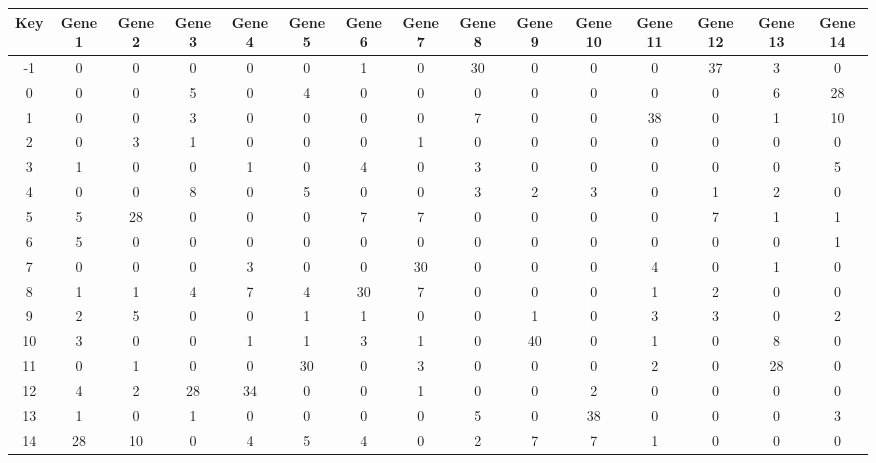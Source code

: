 \begin{tabular}{|c|c|c|c|c|c|c|c|c|c|c|c|c|c|c|}
\hline
Key & Gene 1 & Gene 2 & Gene 3 & Gene 4 & Gene 5 & Gene 6 & Gene 7 & Gene 8 & Gene 9 & Gene 10 & Gene 11 & Gene 12 & Gene 13 & Gene 14 \\
\hline
-1 & 0 & 0 & 0 & 0 & 0 & 1 & 0 & 30 & 0 & 0 & 0 & 37 & 3 & 0 \\
0 & 0 & 0 & 5 & 0 & 4 & 0 & 0 & 0 & 0 & 0 & 0 & 0 & 6 & 28 \\
1 & 0 & 0 & 3 & 0 & 0 & 0 & 0 & 7 & 0 & 0 & 38 & 0 & 1 & 10 \\
2 & 0 & 3 & 1 & 0 & 0 & 0 & 1 & 0 & 0 & 0 & 0 & 0 & 0 & 0 \\
3 & 1 & 0 & 0 & 1 & 0 & 4 & 0 & 3 & 0 & 0 & 0 & 0 & 0 & 5 \\
4 & 0 & 0 & 8 & 0 & 5 & 0 & 0 & 3 & 2 & 3 & 0 & 1 & 2 & 0 \\
5 & 5 & 28 & 0 & 0 & 0 & 7 & 7 & 0 & 0 & 0 & 0 & 7 & 1 & 1 \\
6 & 5 & 0 & 0 & 0 & 0 & 0 & 0 & 0 & 0 & 0 & 0 & 0 & 0 & 1 \\
7 & 0 & 0 & 0 & 3 & 0 & 0 & 30 & 0 & 0 & 0 & 4 & 0 & 1 & 0 \\
8 & 1 & 1 & 4 & 7 & 4 & 30 & 7 & 0 & 0 & 0 & 1 & 2 & 0 & 0 \\
9 & 2 & 5 & 0 & 0 & 1 & 1 & 0 & 0 & 1 & 0 & 3 & 3 & 0 & 2 \\
10 & 3 & 0 & 0 & 1 & 1 & 3 & 1 & 0 & 40 & 0 & 1 & 0 & 8 & 0 \\
11 & 0 & 1 & 0 & 0 & 30 & 0 & 3 & 0 & 0 & 0 & 2 & 0 & 28 & 0 \\
12 & 4 & 2 & 28 & 34 & 0 & 0 & 1 & 0 & 0 & 2 & 0 & 0 & 0 & 0 \\
13 & 1 & 0 & 1 & 0 & 0 & 0 & 0 & 5 & 0 & 38 & 0 & 0 & 0 & 3 \\
14 & 28 & 10 & 0 & 4 & 5 & 4 & 0 & 2 & 7 & 7 & 1 & 0 & 0 & 0 \\
\hline
\end{tabular}